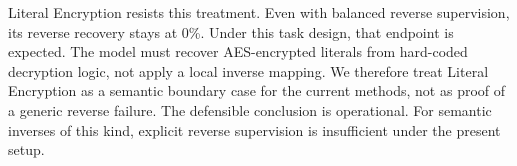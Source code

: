 

Literal Encryption resists this treatment. Even with balanced reverse
supervision, its reverse recovery stays at 0\%.
Under this task design, that endpoint is expected.
The model must recover AES-encrypted literals from hard-coded decryption
logic, not apply a local inverse mapping.
We therefore treat Literal Encryption as a semantic boundary case for the
current methods, not as proof of a generic reverse failure.
The defensible conclusion is operational.
For semantic inverses of this kind, explicit reverse supervision is
insufficient under the present setup.


